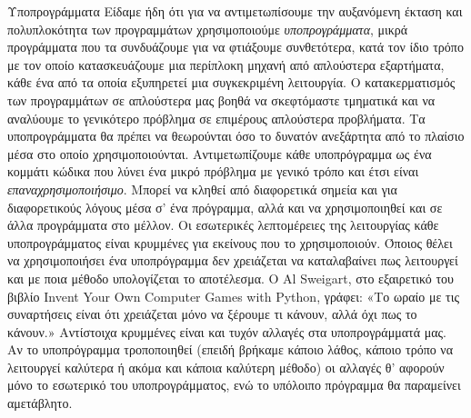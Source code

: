 \documentclass[a4paper,11pt,oneside]{book}
\begin{document}
\begin{theory}{Υποπρογράμματα}
Είδαμε ήδη ότι για να αντιμετωπίσουμε την αυξανόμενη έκταση και πολυπλοκότητα των προγραμμάτων χρησιμοποιούμε \emph{υποπρογράμματα}, μικρά προγράμματα που τα συνδυάζουμε για να φτιάξουμε συνθετότερα, κατά τον ίδιο τρόπο με τον οποίο κατασκευάζουμε μια περίπλοκη μηχανή από απλούστερα εξαρτήματα, κάθε ένα από τα οποία εξυπηρετεί μια συγκεκριμένη λειτουργία. Ο κατακερματισμός των προγραμμάτων σε απλούστερα μας βοηθά να σκεφτόμαστε τμηματικά και να αναλύουμε το γενικότερο πρόβλημα σε επιμέρους απλούστερα προβλήματα. Τα υποπρογράμματα θα πρέπει να θεωρούνται όσο το δυνατόν ανεξάρτητα από το πλαίσιο μέσα στο οποίο χρησιμοποιούνται. Αντιμετωπίζουμε κάθε υποπρόγραμμα ως ένα κομμάτι κώδικα που λύνει ένα μικρό πρόβλημα με γενικό τρόπο και έτσι είναι \emph{επαναχρησιμοποιήσιμο}. Μπορεί να κληθεί από διαφορετικά σημεία και για διαφορετικούς λόγους μέσα σ' ένα πρόγραμμα, αλλά και να χρησιμοποιηθεί και σε άλλα προγράμματα στο μέλλον. 
Οι εσωτερικές λεπτομέρειες της λειτουργίας κάθε υποπρογράμματος είναι κρυμμένες για εκείνους που το χρησιμοποιούν. Όποιος θέλει να χρησιμοποιήσει ένα υποπρόγραμμα δεν χρειάζεται να καταλαβαίνει πως λειτουργεί και με ποια μέθοδο υπολογίζεται το αποτέλεσμα. Ο Al Sweigart, στο εξαιρετικό του βιβλίο Invent Your Own Computer Games with Python, γράφει: «Το ωραίο με τις συναρτήσεις είναι ότι χρειάζεται μόνο να ξέρουμε τι κάνουν, αλλά όχι πως το κάνουν.» Αντίστοιχα κρυμμένες είναι και τυχόν αλλαγές στα υποπρογράμματά μας. Αν το υποπρόγραμμα τροποποιηθεί (επειδή βρήκαμε κάποιο λάθος, κάποιο τρόπο να λειτουργεί καλύτερα ή ακόμα και κάποια καλύτερη μέθοδο) οι αλλαγές θ' αφορούν μόνο το εσωτερικό του υποπρογράμματος, ενώ το υπόλοιπο πρόγραμμα θα παραμείνει αμετάβλητο.

\end{theory}
\end{document}
